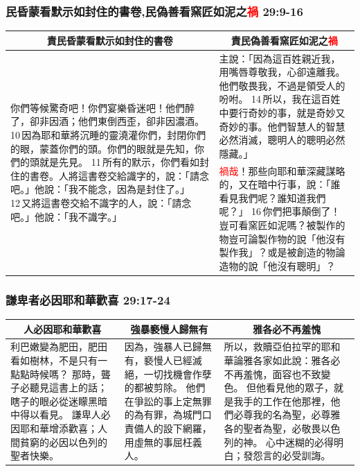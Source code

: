 \subsubsection{民昏蒙看默示如封住的書卷,民偽善看窯匠如泥之\textcolor{red}{禍}  29:9-16}
\begin{table}[H]
\centering
\begin{tabular}{p{7.5cm}|p{9.50cm}}\hline\hline
\multicolumn{1}{c|}{責民昏蒙看默示如封住的書卷}&\multicolumn{1}{c}{責民偽善看窯匠如泥之\textcolor{red}{禍}}\\\hline
\multirow{2}{7.6cm}{你們等候驚奇吧！你們宴樂昏迷吧！他們醉了，卻非因酒；他們東倒西歪，卻非因濃酒。 10 因為耶和華將沉睡的靈澆灌你們，封閉你們的眼，蒙蓋你們的頭。你們的眼就是先知，你們的頭就是先見。 11 所有的默示，你們看如封住的書卷。人將這書卷交給識字的，說：「請念吧。」他說：「我不能念，因為是封住了。」 12 又將這書卷交給不識字的人，說：「請念吧。」他說：「我不識字。」}
&主說：「因為這百姓親近我，用嘴唇尊敬我，心卻遠離我。他們敬畏我，不過是領受人的吩咐。 14 所以，我在這百姓中要行奇妙的事，就是奇妙又奇妙的事。他們智慧人的智慧必然消滅，聰明人的聰明必然隱藏。」\\\cline{2-2}
&\textcolor{red}{禍哉}！那些向耶和華深藏謀略的，又在暗中行事，說：「誰看見我們呢？誰知道我們呢？」 16 你們把事顛倒了！豈可看窯匠如泥嗎？被製作的物豈可論製作物的說「他沒有製作我」？或是被創造的物論造物的說「他沒有聰明」？\\\hline
\end{tabular}
\end{table}

\subsubsection{謙卑者必因耶和華歡喜 29:17-24}
\begin{table}[H]
\centering
\begin{tabular}{p{5.75cm}|p{4.50cm}|p{6.50cm}}\hline\hline
\multicolumn{1}{c|}{人必因耶和華歡喜}&\multicolumn{1}{c|}{強暴褻慢人歸無有}&\multicolumn{1}{c}{雅各必不再羞愧}\\\hline
利巴嫩變為肥田，肥田看如樹林，不是只有一點點時候嗎？
那時，聾子必聽見這書上的話；瞎子的眼必從迷矇黑暗中得以看見。
謙卑人必因耶和華增添歡喜；人間貧窮的必因以色列的聖者快樂。
&因為，強暴人已歸無有，褻慢人已經滅絕，一切找機會作孽的都被剪除。
他們在爭訟的事上定無罪的為有罪，為城門口責備人的設下網羅，用虛無的事屈枉義人。
&所以，救贖亞伯拉罕的耶和華論雅各家如此說：雅各必不再羞愧，面容也不致變色。
但他看見他的眾子，就是我手的工作在他那裡，他們必尊我的名為聖，必尊雅各的聖者為聖，必敬畏以色列的神。
心中迷糊的必得明白；發怨言的必受訓誨。\\\hline
\end{tabular}
\end{table}


